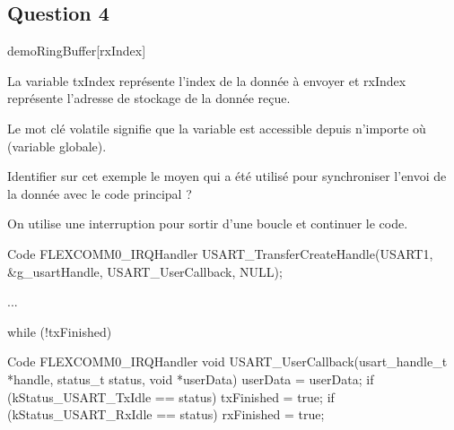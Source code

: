 \subsection{Question 4}

demoRingBuffer[rxIndex] 

La variable txIndex représente l'index de la donnée à envoyer et rxIndex représente l'adresse de stockage de la donnée reçue.

Le mot clé volatile signifie que la variable est accessible depuis n'importe où (variable globale).


Identifier sur cet exemple le moyen qui a été utilisé pour synchroniser l'envoi de la donnée avec le code principal ?

On utilise une interruption pour sortir d'une boucle et continuer le code.

\begin{Cpp}{Code FLEXCOMM0\_IRQHandler}
USART_TransferCreateHandle(USART1, &g_usartHandle, USART_UserCallback, NULL);

...

while (!txFinished)
{
}
\end{Cpp}

\begin{Cpp}{Code FLEXCOMM0\_IRQHandler}
void USART_UserCallback(usart_handle_t *handle, status_t status, void *userData)
{
    userData = userData;
    if (kStatus_USART_TxIdle == status)
    {
        txFinished = true;
    }
    if (kStatus_USART_RxIdle == status)
    {
        rxFinished = true;
    }
}
\end{Cpp}